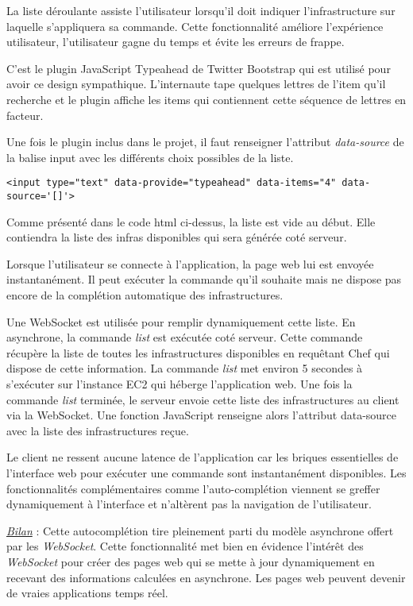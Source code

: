 La liste déroulante assiste l'utilisateur lorsqu'il doit indiquer
l'infrastructure sur laquelle s'appliquera sa commande.
Cette fonctionnalité améliore l'expérience utilisateur, l'utilisateur gagne du
temps et évite les erreurs de frappe.

C'est le plugin JavaScript Typeahead de Twitter Bootstrap qui est utilisé pour
avoir ce design sympathique. L'internaute tape quelques lettres de l'item qu'il
recherche et le plugin affiche les items qui contiennent cette séquence de
lettres en facteur.

Une fois le plugin inclus dans le projet, il faut renseigner l'attribut
\textit{data-source} de la balise input avec les différents choix possibles de
la liste.

\lstset{language=XML}
\begin{lstlisting}[caption=utilisation de bootstrap-typeahead]
  <input type="text" data-provide="typeahead" data-items="4" data-source='[]'>
\end{lstlisting}

Comme présenté dans le code html ci-dessus, la liste est vide au début.
Elle contiendra la liste des infras disponibles qui sera générée coté serveur.

Lorsque l'utilisateur se connecte à l'application, la page web lui est envoyée
instantanément. Il peut exécuter la commande qu'il souhaite mais ne
dispose pas encore de la complétion automatique des infrastructures.

Une WebSocket est utilisée pour remplir dynamiquement cette liste.
En asynchrone, la commande \textit{list} est exécutée coté serveur.
Cette commande récupère la liste de toutes les infrastructures disponibles en
requêtant Chef qui dispose de cette information. La commande \textit{list} met
environ 5 secondes à s'exécuter sur l'instance EC2 qui héberge l'application
web.
Une fois la commande \textit{list} terminée, le serveur envoie cette liste des
infrastructures au client via la WebSocket.
Une fonction JavaScript renseigne alors l'attribut data-source avec
la liste des infrastructures reçue.

Le client ne ressent aucune latence de l'application car les briques essentielles
de l'interface web pour exécuter une commande sont instantanément disponibles.
Les fonctionnalités complémentaires comme l'auto-complétion viennent se greffer
dynamiquement à l'interface et n'altèrent pas la navigation de l'utilisateur.

\underline{\textit{Bilan}} : Cette autocomplétion tire pleinement parti du
modèle asynchrone offert par les \textit{WebSocket}. Cette fonctionnalité met
bien en évidence l'intérêt des \textit{WebSocket} pour créer des pages web qui
se mette à jour dynamiquement en recevant des informations calculées en
asynchrone. Les pages web peuvent devenir de vraies applications temps réel.

